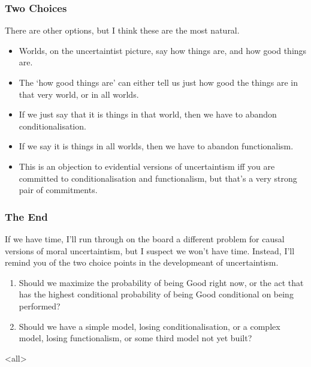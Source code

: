 \begin{frame}[fragile]
\frametitle{Two Choices}
\label{twochoices}

There are other options, but I think these are the most natural.

\begin{itemize}
\item{} Worlds, on the uncertaintist picture, say how things are, and how good things are.

\item{} The `how good things are' can either tell us just how good the things are in that very world, or in all worlds.

\item{} If we just say that it is things in that world, then we have to abandon conditionalisation.

\item{} If we say it is things in all worlds, then we have to abandon functionalism.

\item{} This is an objection to evidential versions of uncertaintism iff you are committed to conditionalisation and functionalism, but that's a very strong pair of commitments.

\end{itemize}

\end{frame}

\begin{frame}[fragile]
\frametitle{The End}
\label{theend}

If we have time, I'll run through on the board a different problem for causal versions of moral uncertaintism, but I suspect we won't have time. Instead, I’ll remind you of the two choice points in the developmeant of uncertaintism.

\begin{enumerate}
\item{} Should we maximize the probability of being Good right now, or the act that has the highest conditional probability of being Good conditional on being performed?

\item{} Should we have a simple model, losing conditionalisation, or a complex model, losing functionalism, or some third model not yet built?

\end{enumerate}
\end{frame}

\mode<all>


\mode*

